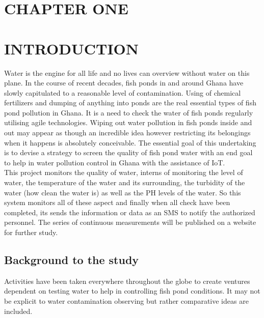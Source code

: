 \documentclass[12pt]{article}
\begin{document}
	
	\thispagestyle{empty}	%
	\clearpage	%

	
	\setcounter{page}{1}		%
	
	
	
	\begin{center}
		\section*{CHAPTER ONE}	
		\section*{INTRODUCTION}
	\end{center}
	
	Water is the engine for all life and no lives can overview without water on this plane. In the course of recent decades, fish ponds in and around Ghana have slowly capitulated to a reasonable level of contamination. Using of chemical fertilizers and dumping of anything into ponds are the real essential types of fish pond pollution in Ghana.   It is a need to check the water of fish ponds regularly utilising agile technologies. Wiping out water pollution in fish ponds inside and out may appear as though an incredible idea however restricting its belongings when it happens is absolutely conceivable. The essential goal of this undertaking is to devise a strategy to screen the quality of fish pond water with an end goal to help in water pollution control in Ghana with the assistance of IoT. \\
	
	This project monitors the quality of water, interns of monitoring the level of water, the temperature of the water and its surrounding, the turbidity of the water (how clean the water is) as well as the PH levels of the water. So this system monitors all of these aspect and finally when all check have been completed, its sends the information or data as an SMS to notify the authorized personnel. The series of continuous measurements will be published on a website for further study.
		\subsection*{Background to the study}	
		Activities have been taken everywhere throughout the globe to create ventures dependent on testing water to help in controlling fish pond conditions. It may not be explicit to water contamination observing but rather comparative ideas are included. \\
		
\end{document}
